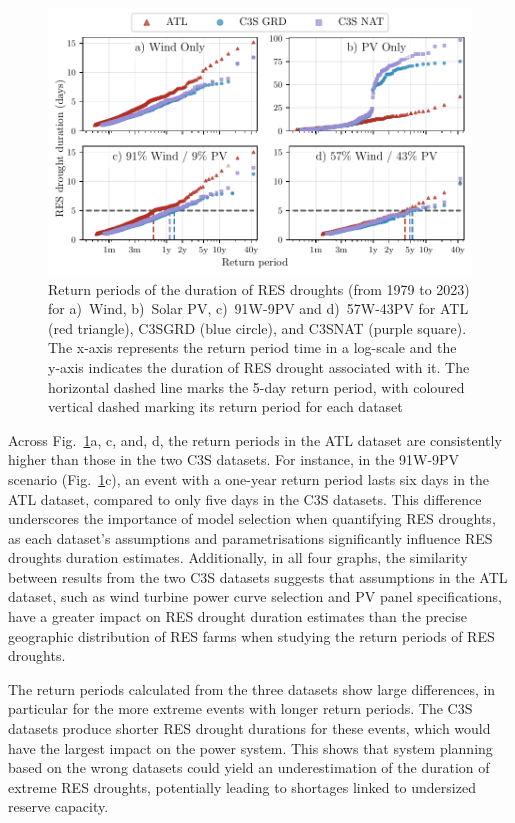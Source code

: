 \documentclass[preprint, 12pt]{elsarticle}
\providecommand{\DIFadd}[1]{{\protect\color{blue}\uwave{#1}}} %
\providecommand{\DIFaddFL}[1]{\DIFadd{#1}} %
\providecommand{\DIFaddbeginFL}{} %
\providecommand{\DIFaddendFL}{} %
\begin{document}
\begin{figure}[!ht]
	\centering
	\includegraphics[width=\textwidth]{droughts_return_periods.pdf}
	\caption{Return periods of the duration of RES droughts  (from 1979 to 2023) for a)~Wind, b)~Solar PV, c)~91W-9PV and d)~57W-43PV for ATL (red triangle), C3S\DIFaddbeginFL \DIFaddFL{~}\DIFaddendFL GRD (blue circle), and C3S\DIFaddbeginFL \DIFaddFL{~}\DIFaddendFL NAT (purple square). The x-axis represents the return period time in a log-scale and the y-axis indicates the duration of RES drought associated with it. The horizontal dashed line marks the 5-day return period, with coloured vertical dashed marking its return period for each dataset}
	\label{fig:return_periods}
\end{figure}

Across Fig.~\ref{fig:return_periods}a, c, and, d, the return periods in the ATL dataset are consistently higher than those in the two C3S datasets. For instance, in the 91W-9PV scenario (Fig.~\ref{fig:return_periods}c), an event with a one-year return period lasts six days in the ATL dataset, compared to only five days in the C3S datasets. This difference underscores the importance of model selection when quantifying RES droughts, as each dataset’s assumptions and parametrisations significantly influence RES droughts duration estimates. Additionally, in all four graphs, the similarity between results from the two C3S datasets suggests that assumptions in the ATL dataset, such as wind turbine power curve selection and PV panel specifications, have a greater impact on RES drought duration estimates than the precise geographic distribution of RES farms when studying the return periods of RES droughts.

The return periods calculated from the three datasets show large differences, in particular for the more extreme events with longer return periods. The C3S datasets produce shorter RES drought durations for these events, which would have the largest impact on the power system. This shows that system planning based on the wrong datasets could yield an underestimation of the duration of extreme RES droughts, potentially leading to shortages linked to undersized reserve capacity.
\end{document}
